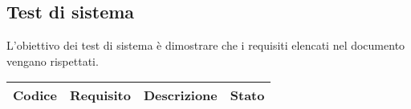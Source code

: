 \subsection{Test di sistema}
L'obiettivo dei test di sistema è dimostrare che i requisiti elencati nel documento \AdR{} \versAdR{} vengano rispettati.


{
    \setlength{\freewidth}{\dimexpr\textwidth-8\tabcolsep}
    \renewcommand{\arraystretch}{1.5}
    \centering
    \setlength{\aboverulesep}{0pt}
    \setlength{\belowrulesep}{0pt}
    \begin{longtable}{C{.20\freewidth} C{.20\freewidth} C{.50\freewidth} C{.10\freewidth}}
        \toprule 
        \textbf{Codice} & \textbf{Requisito} & \textbf{Descrizione} & \textbf{Stato} \\
        \toprule
        \endhead


\end{longtable}}
